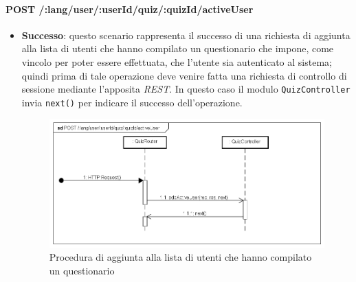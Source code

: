 \paragraph{POST /:lang/user/:userId/quiz/:quizId/activeUser} %
\begin{itemize}
\item \textbf{Successo}: questo scenario rappresenta il successo di una richiesta di aggiunta alla lista di utenti che hanno compilato un questionario che impone, come vincolo per poter essere effettuata, che l'utente sia autenticato al sistema; quindi prima di tale operazione deve venire fatta una richiesta di controllo di sessione mediante l'apposita \textit{REST}. In questo caso il modulo \texttt{QuizController} invia \texttt{next()} per indicare il successo dell'operazione.
\label{Procedura di aggiunta alla lista di utenti che hanno compilato un questionario}
\begin{figure}[ht]
	\centering
	\includegraphics[scale=0.40]{UML/DiagrammiDiSequenza/Back-end/POST__lang_user_userId_quiz_quizId_activeUser_success.png}
	\caption{Procedura di aggiunta alla lista di utenti che hanno compilato un questionario}
\end{figure}
\FloatBarrier


\end{itemize}
